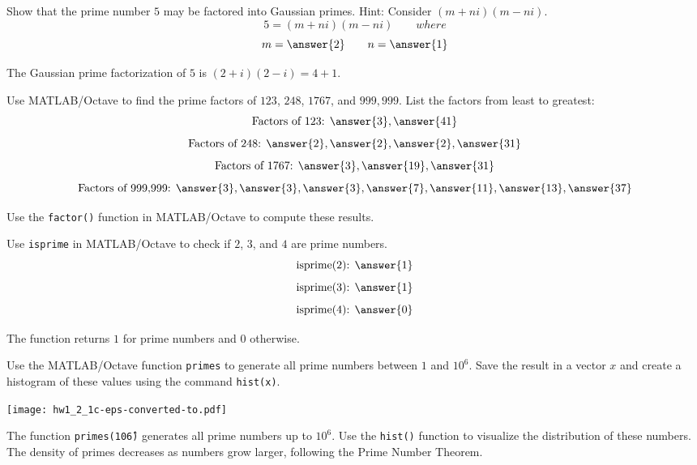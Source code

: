 \documentclass{ximera}
\author{Jont Allen}
\begin{document}
\begin{problem}
    Show that the prime number \(5\) may be factored into Gaussian primes. Hint: Consider $(m + ni)(m - ni)$.
    \[
    5 =  (m + ni)(m - ni)\qquad where
    \]
    \[
    m = \answer{2} \qquad n = \answer{1}
\]  
    \begin{feedback}[correct]
    The Gaussian prime factorization of \(5\) is \((2 + i)(2 - i) = 4 + 1\).
    \end{feedback}
\end{problem}

\begin{problem}
    Use MATLAB/Octave to find the prime factors of \(123\), \(248\), \(1767\), and \(999,999\). List the factors from least to greatest:
    \[
    \text{Factors of 123: } \answer{3}, \answer{41}
    \]
    \[
    \text{Factors of 248: } \answer{2}, \answer{2}, \answer{2}, \answer{31}
    \]
    \[
    \text{Factors of 1767: } \answer{3}, \answer{19}, \answer{31}
    \]
    \[
    \text{Factors of 999,999: } \answer{3}, \answer{3}, \answer{3}, \answer{7}, \answer{11}, \answer{13}, \answer{37}
    \]
    \begin{feedback}[correct]
    Use the \texttt{factor()} function in MATLAB/Octave to compute these results.
    \end{feedback}
\end{problem}

\begin{problem}
    Use \texttt{isprime} in MATLAB/Octave to check if \(2\), \(3\), and \(4\) are prime numbers.
    \[
    \text{isprime(2): } \answer{1}
    \]
    \[
    \text{isprime(3): } \answer{1}
    \]
    \[
    \text{isprime(4): } \answer{0}
    \]
    \begin{feedback}[correct]
    The function returns \(1\) for prime numbers and \(0\) otherwise.
    \end{feedback}
\end{problem}

\begin{problem}
    Use the MATLAB/Octave function \texttt{primes} to generate all prime numbers between \(1\) and \(10^6\).
    Save the result in a vector \(x\) and create a histogram of these values using the command \texttt{hist(x)}.
    \begin{multipleChoice}
    \end{multipleChoice}
    \begin{feedback}[correct]
    \begin{center}
        \texttt{[image: hw1\_2\_1c-eps-converted-to.pdf]}
    \end{center}
    The function \texttt{primes(10\^6)} generates all prime numbers up to \(10^6\). Use the \texttt{hist()} function to visualize the distribution of these numbers. The density of primes decreases as numbers grow larger, following the Prime Number Theorem.
    \end{feedback}
\end{problem}
\end{document}
